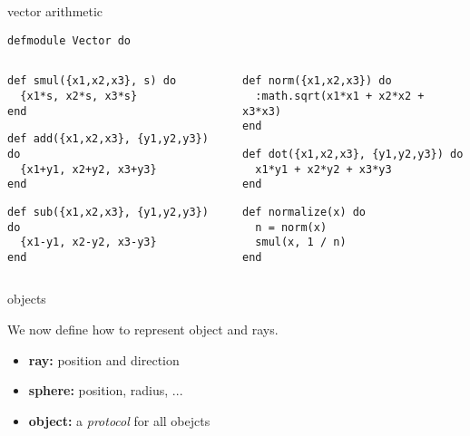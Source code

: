 \begin{frame}[fragile]{vector arithmetic}

\begin{verbatim}
defmodule Vector do
\end{verbatim}


\begin{columns}
  \begin{column}{0.5\linewidth}
  \begin{verbatim}
def smul({x1,x2,x3}, s) do
  {x1*s, x2*s, x3*s}
end
  \end{verbatim}
\pause
  \begin{verbatim}
def add({x1,x2,x3}, {y1,y2,y3}) do
  {x1+y1, x2+y2, x3+y3}
end
  \end{verbatim}
\pause
  \begin{verbatim}
def sub({x1,x2,x3}, {y1,y2,y3}) do
  {x1-y1, x2-y2, x3-y3}
end
  \end{verbatim}
  \end{column}

  \pause

  \begin{column}{0.5\linewidth}
  \begin{verbatim}
def norm({x1,x2,x3}) do
  :math.sqrt(x1*x1 + x2*x2 + x3*x3)
end
  \end{verbatim}
  \begin{verbatim}
def dot({x1,x2,x3}, {y1,y2,y3}) do
  x1*y1 + x2*y2 + x3*y3
end
  \end{verbatim}
\pause
  \begin{verbatim}
def normalize(x) do
  n = norm(x)
  smul(x, 1 / n)
end
  \end{verbatim}
  \end{column}
 \end{columns}

\end{frame}

\begin{frame}[fragile]{objects}

We now define how to represent object and rays.

\pause
\begin{itemize}
  \item {\bf ray:} position and direction
  \item {\bf sphere:} position, radius, ...
  \item {\bf object:} a {\em protocol} for all obejcts
 \end{itemize}

\end{frame}

